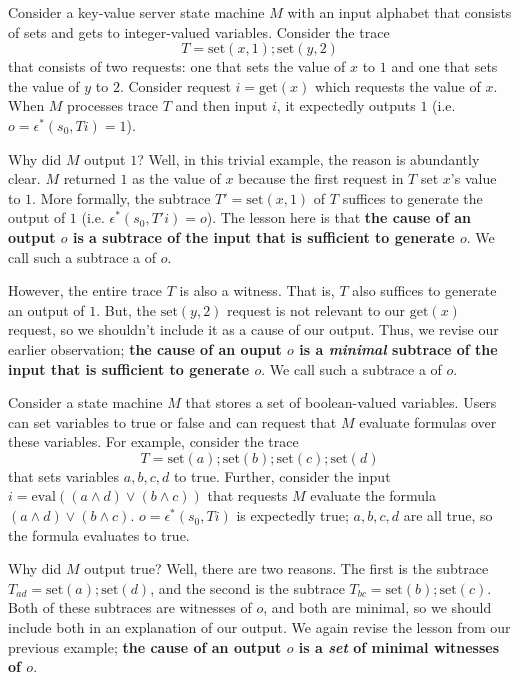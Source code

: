 \begin{example}
  \newcommand{\kvset}{\text{set}}
  \newcommand{\kvget}{\text{get}}
  Consider a key-value server state machine $M$ with an input alphabet that
  consists of sets and gets to integer-valued variables. Consider the trace
  \[
    T = \kvset(x, 1); \kvset(y, 2)
  \]
  that consists of two requests: one that sets the value of $x$ to $1$ and one
  that sets the value of $y$ to $2$. Consider request $i = \kvget(x)$ which
  requests the value of $x$. When $M$ processes trace $T$ and then input $i$,
  it expectedly outputs $1$ (i.e.\ $o = \epsilon^*(s_0, Ti) = 1$).

  Why did $M$ output $1$? Well, in this trivial example, the reason is
  abundantly clear. $M$ returned $1$ as the value of $x$ because the first
  request in $T$ set $x$'s value to $1$. More formally, the subtrace $T' =
  \kvset(x, 1)$ of $T$ suffices to generate the output of $1$ (i.e.
  $\epsilon^*(s_0, T'i) = o$). The lesson here is that \textbf{the cause of an
  output $o$ is a subtrace of the input that is sufficient to generate $o$}. We
  call such a subtrace a  of $o$.

  However, the entire trace $T$ is also a witness. That is, $T$ also suffices
  to generate an output of $1$. But, the $\kvset(y, 2)$ request is not relevant
  to our $\kvget(x)$ request, so we shouldn't include it as a cause of our
  output. Thus, we revise our earlier observation; \textbf{the cause of an
  ouput $o$ is a \emph{minimal} subtrace of the input that is sufficient to
  generate $o$}. We call such a subtrace a  of $o$.
\end{example}

\begin{example}
  \newcommand{\Mset}{\text{set}}
  \newcommand{\Meval}{\text{eval}}
  Consider a state machine $M$ that stores a set of boolean-valued variables.
  Users can set variables to true or false and can request that $M$ evaluate
  formulas over these variables. For example, consider the trace
  \[
    T = \Mset(a); \Mset(b); \Mset(c); \Mset(d)
  \]
  that sets variables $a, b, c, d$ to true. Further, consider the input $i =
  \Meval((a \land d) \lor (b \land c))$ that requests $M$ evaluate the formula
  $(a \land d) \lor (b \land c)$. $o = \epsilon^*(s_0, Ti)$ is expectedly true;
  $a, b, c, d$ are all true, so the formula evaluates to true.

  Why did $M$ output true? Well, there are two reasons. The first is the
  subtrace $T_{ad} = \Mset(a); \Mset(d)$, and the second is the subtrace
  $T_{bc} = \Mset(b); \Mset(c)$. Both of these subtraces are witnesses of $o$,
  and both are minimal, so we should include both in an explanation of our
  output. We again revise the lesson from our previous example; \textbf{the
  cause of an output $o$ is a \emph{set} of minimal witnesses of $o$}.
\end{example}

